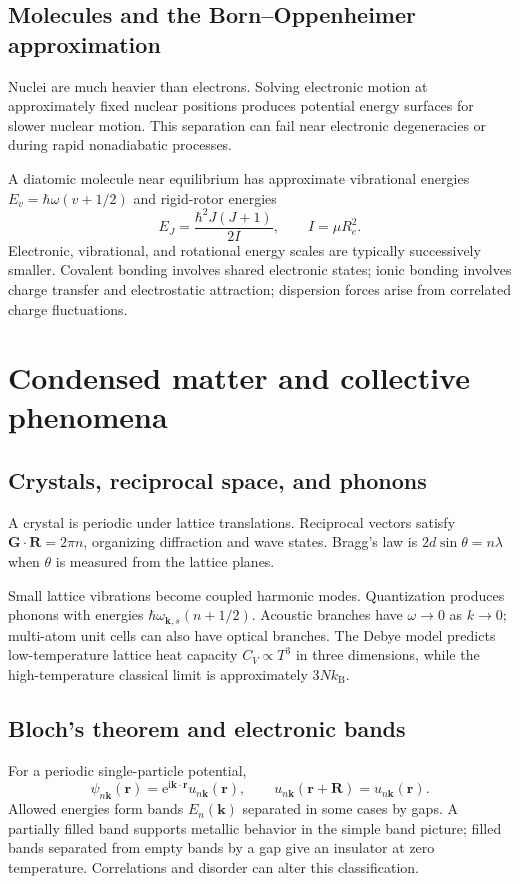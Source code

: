 \documentclass[11pt,oneside]{book}
\newcommand{\ii}{\mathrm{i}}
\newcommand{\ee}{\mathrm{e}}
\newcommand{\vect}[1]{\boldsymbol{#1}}
\newcommand{\kb}{k_{\mathrm B}}
\theoremstyle{reviewstyle}
\begin{document}
\section{Molecules and the Born--Oppenheimer approximation}
Nuclei are much heavier than electrons. Solving electronic motion at approximately fixed nuclear positions produces potential energy surfaces for slower nuclear motion. This separation can fail near electronic degeneracies or during rapid nonadiabatic processes.

A diatomic molecule near equilibrium has approximate vibrational energies $E_v=\hbar\omega(v+1/2)$ and rigid-rotor energies
\begin{equation}E_J=\frac{\hbar^2J(J+1)}{2I},\qquad I=\mu R_e^2.\end{equation}
Electronic, vibrational, and rotational energy scales are typically successively smaller. Covalent bonding involves shared electronic states; ionic bonding involves charge transfer and electrostatic attraction; dispersion forces arise from correlated charge fluctuations.

\chapter{Condensed matter and collective phenomena}
\section{Crystals, reciprocal space, and phonons}
A crystal is periodic under lattice translations. Reciprocal vectors satisfy $\vect G\cdot\vect R=2\pi n$, organizing diffraction and wave states. Bragg's law is $2d\sin\theta=n\lambda$ when $\theta$ is measured from the lattice planes.

Small lattice vibrations become coupled harmonic modes. Quantization produces phonons with energies $\hbar\omega_{\vect k,s}(n+1/2)$. Acoustic branches have $\omega\to0$ as $k\to0$; multi-atom unit cells can also have optical branches. The Debye model predicts low-temperature lattice heat capacity $C_V\propto T^3$ in three dimensions, while the high-temperature classical limit is approximately $3N\kb$.
\section{Bloch's theorem and electronic bands}
For a periodic single-particle potential,
\begin{equation}\psi_{n\vect k}(\vect r)=\ee^{\ii\vect k\cdot\vect r}u_{n\vect k}(\vect r),\qquad u_{n\vect k}(\vect r+\vect R)=u_{n\vect k}(\vect r).\end{equation}
Allowed energies form bands $E_n(\vect k)$ separated in some cases by gaps. A partially filled band supports metallic behavior in the simple band picture; filled bands separated from empty bands by a gap give an insulator at zero temperature. Correlations and disorder can alter this classification.
\end{document}

